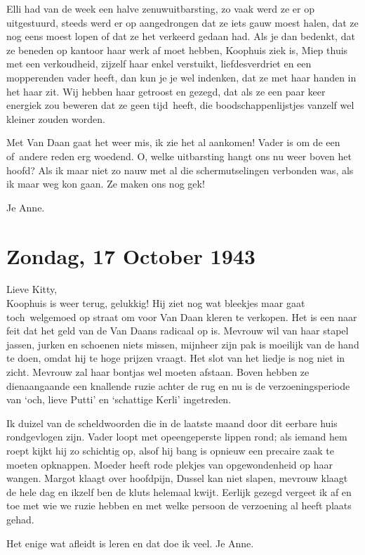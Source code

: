 \documentclass{book}
\begin{document}
Elli had van de week een halve zenuwuitbarsting, zo vaak werd ze er op
uitgestuurd, steeds werd er op aangedrongen dat ze iets gauw moest halen, dat ze
nog eens moest lopen of dat ze het verkeerd gedaan had.  Als je dan bedenkt, dat
ze beneden op kantoor haar werk af moet hebben, Koophuis ziek is, Miep thuis met
een verkoudheid, zijzelf haar enkel verstuikt, liefdesverdriet en een
mopperenden vader heeft, dan kun je je wel indenken, dat ze met haar handen in
het haar zit. Wij hebben haar getroost en gezegd, dat als ze een paar keer
energiek zou beweren dat ze geen tijd~heeft, die boodschappenlijstjes vanzelf
wel kleiner zouden worden.

Met Van Daan gaat het weer mis, ik zie het al aankomen! Vader is om de een
of~andere reden erg woedend. O, welke uitbarsting hangt ons nu weer boven het
hoofd? Als ik maar niet zo nauw met al die schermutselingen verbonden was, als
ik maar weg kon gaan. Ze maken ons nog gek!

Je Anne.

\section*{Zondag, 17 October 1943}

Lieve Kitty,\\
Koophuis is weer terug, gelukkig! Hij ziet nog wat bleekjes maar
gaat toch~welgemoed op straat om voor Van Daan kleren te verkopen. Het is een
naar feit dat het geld van de Van Daans radicaal op is. Mevrouw wil van haar
stapel jassen, jurken en schoenen niets missen, mijnheer zijn pak is moeilijk
van de hand te doen, omdat hij te hoge prijzen vraagt. Het slot van het liedje
is nog niet in zicht. Mevrouw zal haar bontjas wel moeten afstaan. Boven hebben
ze dienaangaande een knallende ruzie achter de rug en nu is de
verzoeningsperiode van `och, lieve Putti' en `schattige Kerli' ingetreden.

Ik duizel van de scheldwoorden die in de laatste maand door dit eerbare huis
rondgevlogen zijn. Vader loopt met opeengeperste lippen rond; als iemand hem
roept kijkt hij zo schichtig op, alsof hij bang is opnieuw een precaire zaak te
moeten opknappen. Moeder heeft rode plekjes van opgewondenheid op haar wangen.
Margot klaagt over hoofdpijn, Dussel kan niet slapen, mevrouw klaagt de hele dag
en ikzelf ben de kluts helemaal kwijt. Eerlijk gezegd vergeet ik af en toe met
wie we ruzie hebben en met welke persoon de verzoening al heeft plaats gehad.

Het enige wat afleidt is leren en dat doe ik veel. Je Anne.
\end{document}
